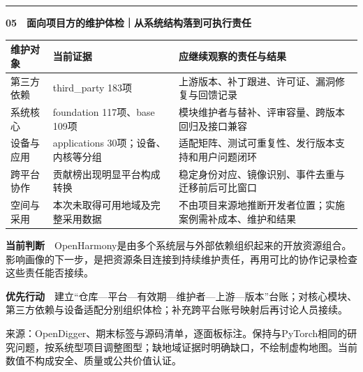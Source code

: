 \documentclass[11pt]{article}
\begin{document}
\vspace{3mm}\hrule\vspace{4mm}
\textbf{\color{teal}05　面向项目方的维护体检｜从系统结构落到可执行责任}\par
\renewcommand{\arraystretch}{1.5}
\begin{tabularx}{\linewidth}{@{}p{31mm}XX@{}}\toprule
维护对象 & 当前证据 & 应继续观察的责任与结果\\\midrule
第三方依赖 & third\_party 183项 & 上游版本、补丁跟进、许可证、漏洞修复与回馈记录\\
系统核心 & foundation 117项、base 109项 & 模块维护者与替补、评审容量、跨版本回归及接口兼容\\
设备与应用 & applications 30项；设备、内核等分组 & 适配矩阵、测试可重复性、发行版本支持和用户问题闭环\\
跨平台协作 & 贡献榜出现明显平台构成转换 & 稳定身份对应、镜像识别、事件去重与迁移前后可比窗口\\
空间与采用 & 本次未取得可用地域及完整采用数据 & 不由项目来源地推断开发者位置；实施案例需补成本、维护和结果\\\bottomrule
\end{tabularx}
\vspace{4mm}
\colorbox{pale}{\parbox{\dimexpr\linewidth-2\fboxsep\relax}{\small\textbf{当前判断}　OpenHarmony是由多个系统层与外部依赖组织起来的开放资源组合。影响画像的下一步，是把资源条目连接到持续维护责任，再用可比的协作记录检查这些责任能否接续。\par\textbf{优先行动}　建立“仓库—平台—有效期—维护者—上游—版本”台账；对核心模块、第三方依赖与设备适配分别组织体检；补充跨平台账号映射后再讨论人员接续。}}
\vspace{2mm}\par{\fontsize{8}{11}\selectfont\color{muted}来源：OpenDigger、期末标签与源码清单，逐面板标注。保持与PyTorch相同的研究问题，按系统型项目调整图型；缺地域证据时明确缺口，不绘制虚构地图。当前数值不构成安全、质量或公共价值认证。}
\end{document}
